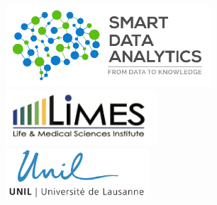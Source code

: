 \begin{frame}
\begin{columns}[t]
	\centering \\ \vspace{-0.5cm} 
	\includegraphics[width=0.575\textwidth]{material/crop-cooperation-sda.png} \\ \vspace{0.85cm}
	\includegraphics[width=0.425\textwidth]{material/crop-cooperation-limes.png} \\ \vspace{0.4cm}
 	\includegraphics[width=0.4\textwidth]{material/crop-cooperation-lausanne.png} \\

\centering \\

\end{columns}

\end{frame}
